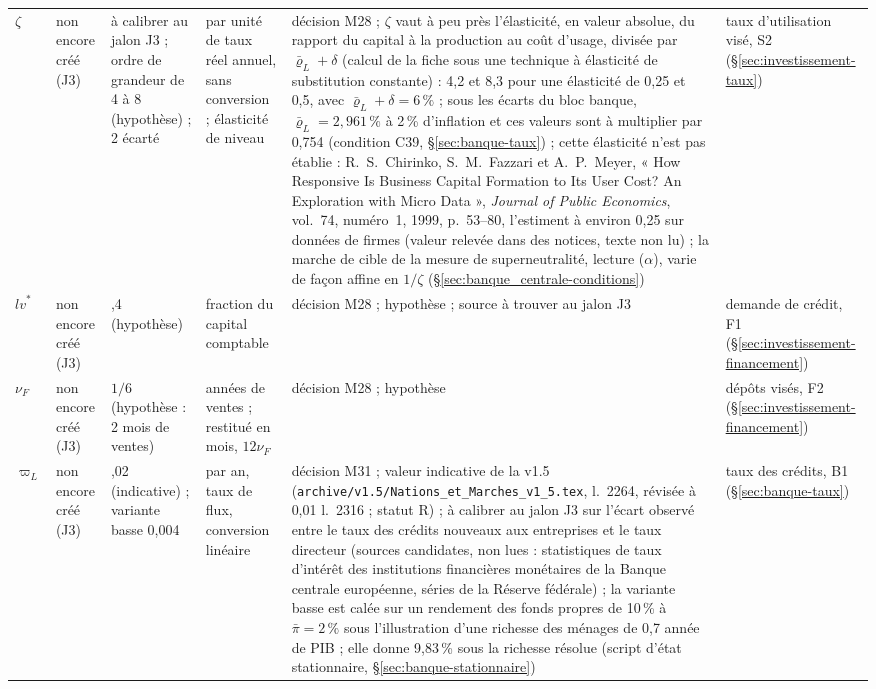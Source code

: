 \documentclass[11pt,a4paper]{article}
\begin{document}
\begin{center}
\begin{longtable}{p{1.5cm}>{\raggedright\arraybackslash}p{3.0cm}>{\raggedright\arraybackslash}p{1.4cm}>{\raggedright\arraybackslash}p{1.8cm}>{\raggedright\arraybackslash}p{3.4cm}>{\raggedright\arraybackslash}p{2.6cm}}
$\zeta$ & non encore créé (J3) & à calibrer au jalon J3 ; ordre de grandeur de 4 à 8 (hypothèse) ; 2 écarté & par unité de taux réel annuel, sans conversion ; élasticité de niveau & décision M28 ; $\zeta$ vaut à peu près l'élasticité, en valeur absolue, du rapport du capital à la production au coût d'usage, divisée par $\bar\varrho_L + \delta$ (calcul de la fiche sous une technique à élasticité de substitution constante) : 4,2 et 8,3 pour une élasticité de 0,25 et 0,5, avec $\bar\varrho_L + \delta = 6\,\%$ ; sous les écarts du bloc banque, $\bar\varrho_L = 2{,}961\,\%$ à 2\,\% d'inflation et ces valeurs sont à multiplier par 0,754 (condition C39, \S\ref{sec:banque-taux}) ; cette élasticité n'est pas établie : R.~S.~Chirinko, S.~M.~Fazzari et A.~P.~Meyer, « How Responsive Is Business Capital Formation to Its User Cost? An Exploration with Micro Data », \emph{Journal of Public Economics}, vol.~74, numéro~1, 1999, p.~53--80, l'estiment à environ 0,25 sur données de firmes (valeur relevée dans des notices, texte non lu) ; la marche de cible de la mesure de superneutralité, lecture ($\alpha$), varie de façon affine en $1/\zeta$ (\S\ref{sec:banque_centrale-conditions}) & taux d'utilisation visé, S2 (\S\ref{sec:investissement-taux})\\
$\mathit{lv}^\ast$ & non encore créé (J3) & 0,4 (hypothèse) & fraction du capital comptable & décision M28 ; hypothèse ; source à trouver au jalon J3 & demande de crédit, F1 (\S\ref{sec:investissement-financement})\\
$\nu_F$ & non encore créé (J3) & $1/6$ (hypothèse : 2 mois de ventes) & années de ventes ; restitué en mois, $12\nu_F$ & décision M28 ; hypothèse & dépôts visés, F2 (\S\ref{sec:investissement-financement})\\
$\varpi_L$ & non encore créé (J3) & 0,02 (indicative) ; variante basse 0,004 & par an, taux de flux, conversion linéaire & décision M31 ; valeur indicative de la v1.5 (\nolinkurl{archive/v1.5/Nations_et_Marches_v1_5.tex}, l.~2264, révisée à 0,01 l.~2316 ; statut R) ; à calibrer au jalon J3 sur l'écart observé entre le taux des crédits nouveaux aux entreprises et le taux directeur (sources candidates, non lues : statistiques de taux d'intérêt des institutions financières monétaires de la Banque centrale européenne, séries de la Réserve fédérale) ; la variante basse est calée sur un rendement des fonds propres de 10\,\% à $\bar\pi = 2\,\%$ sous l'illustration d'une richesse des ménages de 0,7 année de PIB ; elle donne 9,83\,\% sous la richesse résolue (script d'état stationnaire, \S\ref{sec:banque-stationnaire}) & taux des crédits, B1 (\S\ref{sec:banque-taux})\\

\end{longtable}
\end{center}
\end{document}
